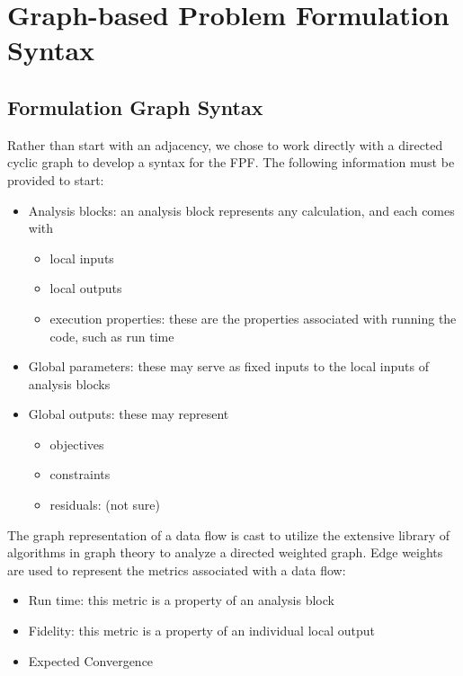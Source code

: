 \section{Graph-based Problem Formulation Syntax}
    \subsection{Formulation Graph Syntax}
    Rather than start with an adjacency, we chose to work directly with a directed cyclic graph to develop a syntax for the FPF. 
    The following information must be provided to start:
    \begin{itemize}
        \item Analysis blocks: an analysis block represents any calculation, and each comes with
            \begin{itemize}
                \item local inputs
                \item local outputs 
                \item execution properties: these are the properties associated with running the code, such as run time
            \end{itemize}
        \item Global parameters: these may serve as fixed inputs to the local inputs of analysis blocks
        \item Global outputs: these may represent
            \begin{itemize}
                \item objectives
                \item constraints
                \item residuals: (not sure)
            \end{itemize}
    \end{itemize}

    The graph representation of a data flow is cast to utilize the extensive library of algorithms in graph theory to analyze a directed weighted graph. 
    Edge weights are used to represent the metrics associated with a data flow:
    \begin{itemize}
        \item Run time: this metric is a property of an analysis block
        \item Fidelity: this metric is a property of an individual local output
        \item Expected Convergence
    \end{itemize}

